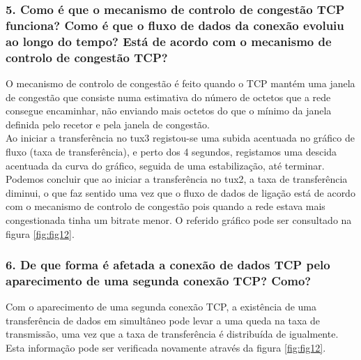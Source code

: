 \subsubsection{5. Como é que o mecanismo de controlo de congestão TCP funciona? Como é que o fluxo de dados da conexão evoluiu ao longo do tempo? Está de acordo com o mecanismo de controlo de congestão TCP?}
O mecanismo de controlo de congestão é feito quando o TCP mantém uma janela de congestão que consiste numa estimativa do número de octetos que a rede consegue encaminhar, não enviando mais octetos do que o mínimo da janela definida pelo recetor e pela janela de congestão.\\
Ao iniciar a transferência no tux3 registou-se uma subida acentuada no gráfico de fluxo (taxa de transferência), e perto dos 4 segundos, registamos uma descida acentuada da curva do gráfico, seguida de uma estabilização, até terminar. Podemos concluir que ao iniciar a transferência no tux2, a taxa de transferência diminui, o que faz sentido uma vez que o fluxo de dados de ligação está de acordo com o mecanismo de controlo de congestão pois quando a rede estava mais congestionada tinha um bitrate menor. O referido gráfico pode ser consultado na figura \ref{fig:fig12}.

\subsubsection{6. De que forma é afetada a conexão de dados TCP pelo aparecimento de uma segunda conexão TCP? Como?}
Com o aparecimento de uma segunda conexão TCP, a existência de uma transferência de dados em simultâneo pode levar a uma queda na taxa de transmissão, uma vez que a taxa de transferência é distribuída de igualmente. Esta informação pode ser verificada novamente através da figura \ref{fig:fig12}.